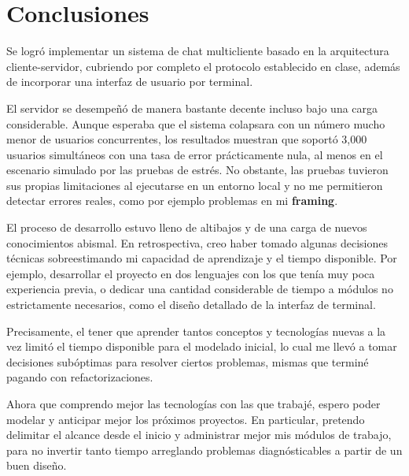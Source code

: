 \section{Conclusiones}

Se logró implementar un sistema de chat multicliente basado en la arquitectura cliente-servidor, cubriendo
por completo el protocolo establecido en clase, además de incorporar una interfaz de usuario por terminal.

El servidor se desempeñó de manera bastante decente incluso bajo una carga considerable. Aunque esperaba
que el sistema colapsara con un número mucho menor de usuarios concurrentes, los resultados muestran que soportó
3,000 usuarios simultáneos con una tasa de error prácticamente nula, al menos en el escenario simulado por las
pruebas de estrés. No obstante, las pruebas tuvieron sus propias limitaciones al ejecutarse en un entorno local y no 
me permitieron detectar errores reales, como por ejemplo problemas en mi \textbf{framing}.

El proceso de desarrollo estuvo lleno de altibajos y de una carga de nuevos conocimientos
abismal. En retrospectiva, creo haber tomado algunas decisiones técnicas sobreestimando mi capacidad de
aprendizaje y el tiempo disponible. Por ejemplo, desarrollar el proyecto en dos lenguajes con los que 
tenía muy poca experiencia previa, o dedicar una cantidad considerable de tiempo a módulos no 
estrictamente necesarios, como el diseño detallado de la interfaz de terminal. 

Precisamente, el tener que aprender tantos conceptos y tecnologías nuevas a la vez limitó el tiempo 
disponible para el modelado inicial, lo cual me llevó a tomar decisiones subóptimas para resolver ciertos
problemas, mismas que terminé pagando con refactorizaciones.

Ahora que comprendo mejor las tecnologías con las que trabajé, espero poder modelar y anticipar mejor los próximos 
proyectos. En particular, pretendo delimitar el alcance desde el inicio y administrar mejor mis módulos de
trabajo, para no invertir tanto tiempo arreglando problemas diagnósticables a partir de un buen diseño.